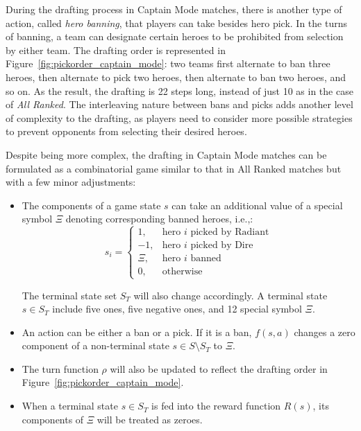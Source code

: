 During the drafting process in Captain Mode matches, there is another type of action, called \textit{hero banning}, that players can take besides hero pick. In the turns of banning, a team can designate certain heroes to be prohibited from selection by either team. The drafting order is represented in Figure~\ref{fig:pickorder_captain_mode}: two teams first alternate to ban three heroes, then alternate to pick two heroes, then alternate to ban two heroes, and so on. As the result, the drafting is 22 steps long, instead of just 10 as in the case of \textit{All Ranked}. The interleaving nature between bans and picks adds another level of complexity to the drafting, as players need to consider more possible strategies to prevent opponents from selecting their desired heroes. 

Despite being more complex, the drafting in Captain Mode matches can be formulated as a combinatorial game similar to that in All Ranked matches but with a few minor adjustments:

\begin{itemize}
    \item The components of a game state $s$ can take an additional value of a special symbol $\Xi$ denoting corresponding banned heroes, i.e.,:
\begin{equation}
s_{i}=
\begin{cases}
  1, & \text{hero } i \text{ picked by Radiant} \\
  -1, & \text{hero } i \text{ picked by Dire} \\
  \Xi, & \text{hero }i \text{ banned} \\
  0, & \text{otherwise}
\end{cases}
\label{eqn:sifeature}
\end{equation}

The terminal state set $S_T$ will also change accordingly. A terminal state $s \in S_T$ include five ones, five negative ones, and 12 special symbol $\Xi$.

    \item An action can be either a ban or a pick. If it is a ban, $f(s,a)$ changes a zero component of a non-terminal state $s \in S \setminus S_T$ to $\Xi$. 
    \item The turn function $\rho$ will also be updated to reflect the drafting order in Figure~\ref{fig:pickorder_captain_mode}.
    \item When a terminal state $s \in S_T$ is fed into the reward function $R(s)$, its components of $\Xi$ will be treated as zeroes.
\end{itemize}


